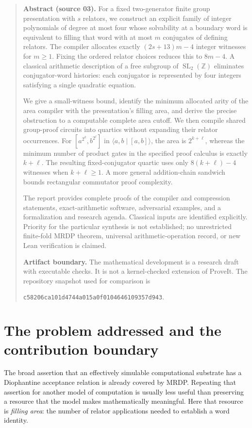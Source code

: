 \documentclass[11pt,letterpaper]{article}
\theoremstyle{definition}
\theoremstyle{remark}
\newcommand{\Z}{\mathbb Z}
\newcommand{\SL}{\operatorname{SL}}
\newcommand{\sha}{\texttt{c58206ca101d4744a015a0f0104646109357d943}}
\begin{document}
\begin{quote}\small
\textbf{Abstract (source 03).} For a fixed two-generator finite group presentation with $s$ relators, we construct an explicit family of integer polynomials of degree at most four whose solvability at a boundary word is equivalent to filling that word with at most $m$ conjugates of defining relators. The compiler allocates exactly $(2s+13)m-4$ integer witnesses for $m\geq1$. Fixing the ordered relator choices reduces this to $8m-4$. A classical arithmetic description of a free subgroup of $\SL_2(\Z)$ eliminates conjugator-word histories: each conjugator is represented by four integers satisfying a single quadratic equation.

We give a small-witness bound, identify the minimum allocated arity of the area compiler with the presentation's filling area, and derive the precise obstruction to a computable complete area cutoff. We then compile shared group-proof circuits into quartics without expanding their relator occurrences. For
$[a^{2^k},b^{2^\ell}]$ in $\langle a,b\mid[a,b]\rangle$, the area is $2^{k+\ell}$, whereas the minimum number of product gates in the specified proof calculus is exactly $k+\ell$. The resulting fixed-conjugator quartic uses only $8(k+\ell)-4$ witnesses when $k+\ell\geq1$. A more general addition-chain sandwich bounds rectangular commutator proof complexity.

The report provides complete proofs of the compiler and compression statements, exact-arithmetic software, adversarial examples, and a formalization and research agenda. Classical inputs are identified explicitly. Priority for the particular synthesis is not established; no unrestricted finite-fold MRDP theorem, universal arithmetic-operation record, or new Lean verification is claimed.

\medskip
\textbf{Artifact boundary.} The mathematical development is a research draft with executable checks. It is not a kernel-checked extension of ProveIt. The repository snapshot used for comparison is\par
\sha.
\end{quote}

\section{The problem addressed and the contribution boundary}\label{gts:vk:sec:problem}

The broad assertion that an effectively simulable computational substrate has a Diophantine acceptance relation is already covered by MRDP. Repeating that assertion for another model of computation is usually less useful than preserving a resource that the model makes mathematically meaningful. Here that resource is \emph{filling area}: the number of relator applications needed to establish a word identity.
\end{document}

